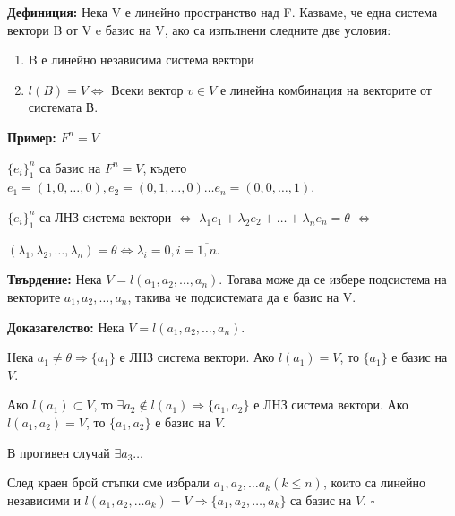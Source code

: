 \documentclass[fleqn,12pt]{article}
\begin{document}
\begin{flushleft}
    \textbf{Дефиниция:} Нека V е линейно пространство над F. Казваме, че една система вектори B от V e базис на V, ако са изпълнени следните две условия:

    \begin{enumerate}
        \item B е линейно независима система вектори
        \item $l(B) = V \Leftrightarrow $ Всеки вектор $ v \in V $ е линейна комбинация на векторите от системата В.
    \end{enumerate}

\textbf{Пример:} $ F^n = V $

$\{ e_i\}_1^n $ са базис на $ F^n = V $, където $ e_1 = (1, 0, \dots, 0), e_2 = (0, 1, \dots, 0) \dots e_n = (0, 0, \dots, 1)$.

$ \{ e_i\}_1^n $ са ЛНЗ система вектори $\iff$ $ \lambda_1 e_1 + \lambda_2 e_2 + \dots + \lambda_n e_n = \theta $ $\iff$

$ (\lambda_1, \lambda_2, \dots, \lambda_n) = \theta \Leftrightarrow \lambda_i = 0, i = \overline{1,n}$.

    
    \vspace{5mm}

    \textbf{Твърдение:} Нека $ V = l(a_1, a_2, \dots, a_n) $. Тогава може да се избере подсистема на векторите $ a_1, a_2, \dots, a_n $, такива че подсистемата да е базис на V.

    \vspace{5mm}
    
        \textbf{Доказателство:}
        Нека $ V = l(a_1, a_2, \dots, a_n) $.

        Нека $ a_1 \neq \theta \Rightarrow \{a_1\}$ е ЛНЗ система вектори.
        Ако $ l(a_1) = V$, то $\{a_1\}$ е базис на $V$.

        \vspace{4mm}

        Ако $l(a_1) \subset V$, то $\exists a_2 \notin l(a_1) \Rightarrow \{a_1, a_2\}$ е ЛНЗ система вектори.
        Ако $ l(a_1, a_2) = V$, то $\{a_1, a_2\}$ е базис на $V$.

        \vspace{4mm}

        В противен случай $\exists a_3 \dots$

        След краен брой стъпки сме избрали $a_1, a_2, \dots a_k (k \leq n) $, които са линейно независими и $l(a_1, a_2, \dots a_k) = V \Rightarrow \{a_1, a_2, \dots, a_k\}$ са базис на $V$. $\square$
    

\end{flushleft}
\end{document}
